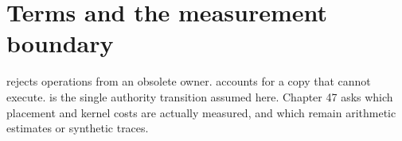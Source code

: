 \section{Terms and the measurement boundary}
 rejects operations from an obsolete owner.
 accounts for a copy that cannot execute.
 is the single authority transition assumed here.
Chapter 47 asks which placement and kernel costs are actually measured, and
which remain arithmetic estimates or synthetic traces.
